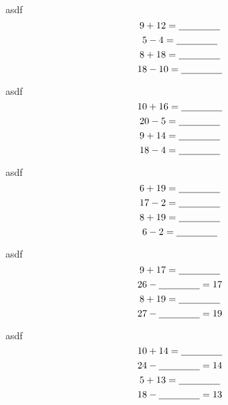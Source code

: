 \documentclass[letter, grid,frame,backs]{flashcards}
\begin{document}
\begin{flashcard}{asdf}
\Huge
\center
\vspace*{-0.8in}
\[
9 + 12 = \underline{\hspace{1.5cm}} 
\]
\[
5 - 4 = \underline{\hspace{1.5cm}}
\]
\[
8 + 18 = \underline{\hspace{1.5cm}} 
\]
\[
18 - 10 = \underline{\hspace{1.5cm}}
\]

\end{flashcard}
\begin{flashcard}{asdf}
\Huge
\center
\vspace*{-0.8in}
\[
10 + 16 = \underline{\hspace{1.5cm}} 
\]
\[
20 - 5 = \underline{\hspace{1.5cm}}
\]
\[
9 + 14 = \underline{\hspace{1.5cm}} 
\]
\[
18 - 4 = \underline{\hspace{1.5cm}}
\]

\end{flashcard}
\begin{flashcard}{asdf}
\Huge
\center
\vspace*{-0.8in}
\[
6 + 19 = \underline{\hspace{1.5cm}} 
\]
\[
17 - 2 = \underline{\hspace{1.5cm}}
\]
\[
8 + 19 = \underline{\hspace{1.5cm}} 
\]
\[
6 - 2 = \underline{\hspace{1.5cm}}
\]

\end{flashcard}
\begin{flashcard}{asdf}
\Huge
\center
\vspace*{-0.8in}
\[ 9 + 17 = \underline{\hspace{1.5cm}} 
\]
\[
26 - \underline{\hspace{1.5cm}} = 17
\]\[ 8 + 19 = \underline{\hspace{1.5cm}} 
\]
\[
27 - \underline{\hspace{1.5cm}} = 19
\]
\end{flashcard}
\begin{flashcard}{asdf}
\Huge
\center
\vspace*{-0.8in}
\[ 10 + 14 = \underline{\hspace{1.5cm}} 
\]
\[
24 - \underline{\hspace{1.5cm}} = 14
\]\[ 5 + 13 = \underline{\hspace{1.5cm}} 
\]
\[
18 - \underline{\hspace{1.5cm}} = 13
\]
\end{flashcard}
\end{document}
